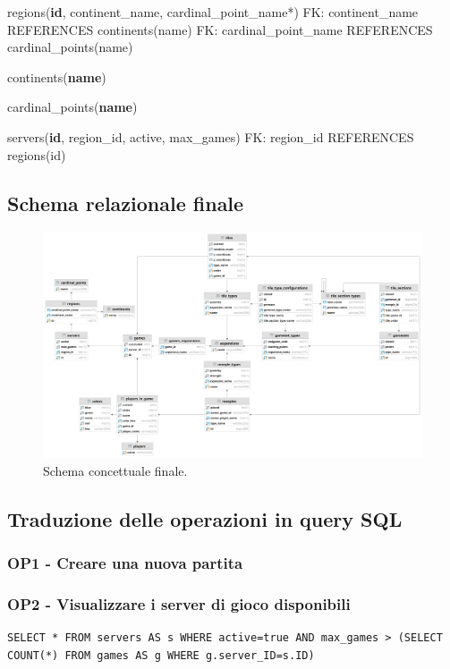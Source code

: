 regions(\textbf{id}, continent\_name, cardinal\_point\_name*)\newline
FK: continent\_name REFERENCES continents(name)\newline
FK: cardinal\_point\_name REFERENCES cardinal\_points(name)\newline

continents(\textbf{name})\newline

cardinal\_points(\textbf{name})\newline

servers(\textbf{id}, region\_id, active, max\_games)\newline
FK: region\_id REFERENCES regions(id)

\subsection{Schema relazionale finale}
\begin{figure}[hb]
    \centering\includegraphics[scale=0.06]{images/Progettazione/relazionale.png}
    \caption{Schema concettuale finale.}
\end{figure}

\subsection{Traduzione delle operazioni in query SQL}
\subsubsection*{OP1 - Creare una nuova partita}

\subsubsection*{OP2 - Visualizzare i server di gioco disponibili}
\begin{lstlisting}[style=sql]
    SELECT * FROM servers AS s WHERE active=true AND max_games > (SELECT COUNT(*) FROM games AS g WHERE g.server_ID=s.ID)
\end{lstlisting}

